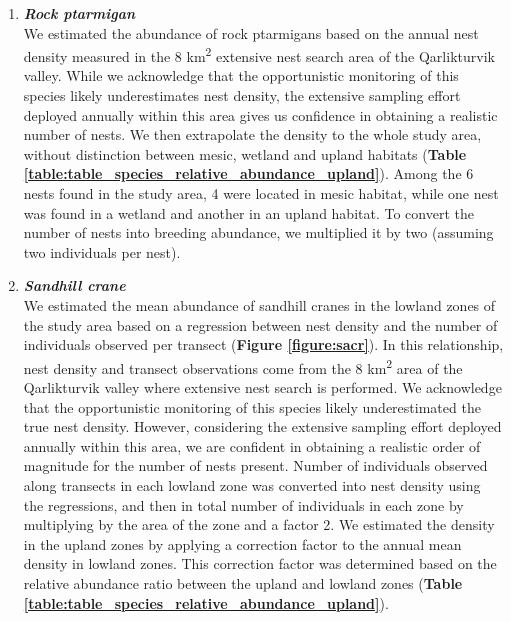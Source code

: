 \documentclass[a4paper,twoside,12pt]{article}
\begin{document}
\begin{enumerate}[label=\alph*.]
                \item[] \textit{\textbf{Rock ptarmigan}}\\
                We estimated the abundance of rock ptarmigans based on the annual nest density measured in the 8 km\textsuperscript{2} extensive nest search area of the Qarlikturvik valley. While we acknowledge that the opportunistic monitoring of this species likely underestimates nest density, the extensive sampling effort deployed annually within this area gives us confidence in obtaining a realistic number of nests. We then extrapolate the density to the whole study area, without distinction between mesic, wetland and upland habitats (\textbf{Table \ref{table:table_species_relative_abundance_upland}}). Among the 6 nests found in the study area, 4 were located in mesic habitat, while one nest was found in a wetland and another in an upland habitat. To convert the number of nests into breeding abundance, we multiplied it by two (assuming two individuals per nest).
                
                \item[] \textit{\textbf{Sandhill crane}}\\
                We estimated the mean abundance of sandhill cranes in the lowland zones of the study area based on a regression between nest density and the number of individuals observed per transect (\textbf{Figure \ref{figure:sacr}}). In this relationship, nest density and transect observations come from the 8 km\textsuperscript{2} area of the Qarlikturvik valley where extensive nest search is performed. We acknowledge that the opportunistic monitoring of this species likely underestimated the true nest density. However, considering the extensive sampling effort deployed annually within this area, we are confident in obtaining a realistic order of magnitude for the number of nests present. Number of individuals observed along transects in each lowland zone was converted into nest density using the regressions, and then in total number of individuals in each zone by multiplying by the area of the zone and a factor 2. We estimated the density in the upland zones by applying a correction factor to the annual mean density in lowland zones. This correction factor was determined based on the relative abundance ratio between the upland and lowland zones (\textbf{Table \ref{table:table_species_relative_abundance_upland}}). 
                

\end{enumerate}
\end{document}
